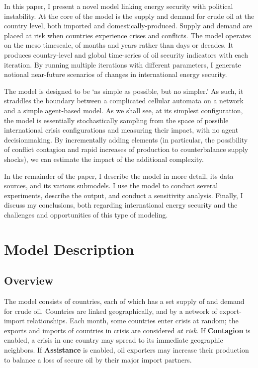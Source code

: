 \documentclass{llncs}
\begin{document}
In this paper, I present a novel model linking energy security with political instability. At the core of the model is the supply and demand for crude oil at the country level, both imported and domestically-produced. Supply and demand are placed at risk when countries experience crises and conflicts. The model operates on the meso timescale, of months and years rather than days or decades.  It produces country-level and global time-series of oil security indicators with each iteration. By running multiple iterations with different parameters, I generate notional near-future scenarios of changes in international energy security. 

The model is designed to be `as simple as possible, but no simpler.'  As such, it straddles the boundary between a complicated cellular automata on a network and a simple agent-based model. As we shall see, at its simplest configuration, the model is essentially stochastically sampling from the space of possible international crisis configurations and measuring their impact, with no agent decisionmaking. By incrementally adding elements (in particular, the possibility of conflict contagion and rapid increases of production to counterbalance supply shocks), we can estimate the impact of the additional complexity. 

In the remainder of the paper, I describe the model in more detail, its data sources, and its various submodels. I use the model to conduct several experiments, describe the output, and conduct a sensitivity analysis. Finally, I discuss my conclusions, both regarding international energy security and the challenges and opportunities of this type of modeling.

\section{Model Description}

\subsection{Overview}

The model consists of countries, each of which has a set supply of and demand for crude oil. Countries are linked geographically, and by a network of export-import relationships. Each month, some countries enter crisis at random; the exports and imports of countries in crisis are considered \emph{at risk}. If \textbf{Contagion} is enabled, a crisis in one country may spread to its immediate geographic neighbors. If \textbf{Assistance} is enabled, oil exporters may increase their production to balance a loss of secure oil by their major import partners.
\end{document}
